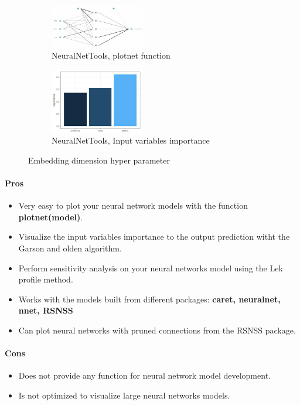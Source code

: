 \documentclass[letter]{article}\usepackage[]{graphicx}\usepackage[]{color}
\begin{document}
\begin{figure}[H]
  \begin{subfigure}{0.5\textwidth}
    \centering\includegraphics[width=0.45\textwidth]{figure/plotnet.png}
    \caption{NeuralNetTools, plotnet function}
  \end{subfigure}
  \begin{subfigure}{0.5\textwidth}
    \centering\includegraphics[width=0.45\textwidth]{figure/garson_algorithm.png}
    \caption{NeuralNetTools, Input variables importance}
  \end{subfigure}
    \caption{Embedding dimension hyper parameter}
\end{figure}

\paragraph{Pros}
\begin{itemize}
\item Very easy to plot your neural network models with the function \textbf{plotnet(model)}.
\item Visualize the input variables importance to the output prediction witht the Garson and olden algorithm.
\item Perform sensitivity analysis on your neural networks model using the Lek profile method.
\item Works with the models built from different packages: \textbf{caret, neuralnet, nnet, RSNSS}
\item Can plot neural networks with pruned connections from the RSNSS package.
\end{itemize}

\paragraph{Cons}
\begin{itemize}
\item Does not provide any function for neural network model development.
\item Is not optimized to visualize large neural networks models.
\end{itemize}
\end{document}
